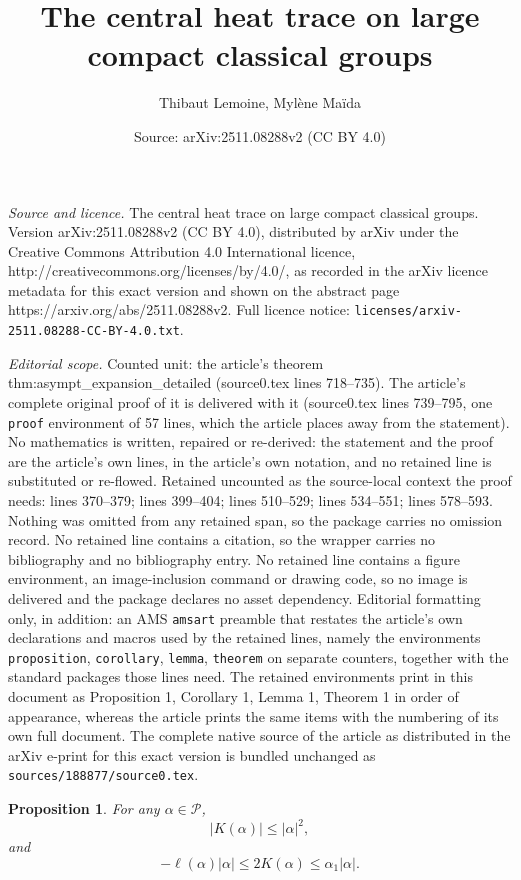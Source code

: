 \documentclass[10pt,a4paper]{amsart}
\title{The central heat trace on large compact classical groups}
\author{Thibaut Lemoine, Myl\`ene Ma\"ida}
\date{Source: arXiv:2511.08288v2 (CC BY 4.0)}
\newtheorem{proposition}{Proposition}
\newcommand\Pfr{\mathscr{P}}
\begin{document}
\maketitle

\noindent\emph{Source and licence.} The central heat trace on large compact classical groups. Version arXiv:2511.08288v2 (CC BY 4.0), distributed by arXiv under the Creative Commons Attribution 4.0 International licence, http://creativecommons.org/licenses/by/4.0/, as recorded in the arXiv licence metadata for this exact version and shown on the abstract page https://arxiv.org/abs/2511.08288v2. Full licence notice: \texttt{licenses/arxiv-2511.08288-CC-BY-4.0.txt}.\par\smallskip

\noindent\textit{Editorial scope.} Counted unit: the article's theorem thm:asympt\_expansion\_detailed (source0.tex lines 718--735). The article's complete original proof of it is delivered with it (source0.tex lines 739--795, one \texttt{proof} environment of 57 lines, which the article places away from the statement). No mathematics is written, repaired or re-derived: the statement and the proof are the article's own lines, in the article's own notation, and no retained line is substituted or re-flowed.  Retained uncounted as the source-local context the proof needs: lines 370--379; lines 399--404; lines 510--529; lines 534--551; lines 578--593.  Nothing was omitted from any retained span, so the package carries no omission record.  No retained line contains a citation, so the wrapper carries no bibliography and no bibliography entry.  No retained line contains a figure environment, an image-inclusion command or drawing code, so no image is delivered and the package declares no asset dependency.  Editorial formatting only, in addition: an AMS \texttt{amsart} preamble that restates the article's own declarations and macros used by the retained lines, namely the environments \texttt{proposition}, \texttt{corollary}, \texttt{lemma}, \texttt{theorem} on separate counters, together with the standard packages those lines need.  The retained environments print in this document as Proposition 1, Corollary 1, Lemma 1, Theorem 1 in order of appearance, whereas the article prints the same items with the numbering of its own full document.  The complete native source of the article as distributed in the arXiv e-print for this exact version is bundled unchanged as \texttt{sources/188877/source0.tex}.
\begin{proposition}\label{prop:bound_content}
For any $\alpha\in\Pfr$,
\begin{equation}\label{eq:bound_content_1}
\vert K(\alpha)\vert\leq \vert\alpha\vert^2,
\end{equation}
and
\begin{equation}\label{eq:bound_content_2}
-\ell(\alpha)\vert\alpha\vert\leq 2K(\alpha) \leq \alpha_1\vert\alpha\vert.
\end{equation}
\end{proposition}
\end{document}
